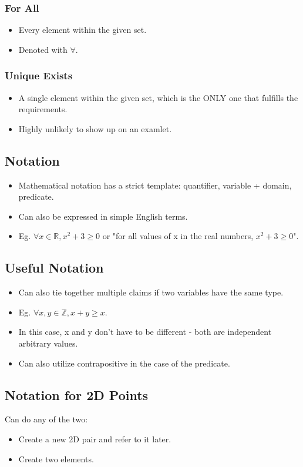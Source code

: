 \subsubsection{For All}
\begin{itemize}
    \item Every element within the given set.
    \item Denoted with $\forall$.
\end{itemize}
\subsubsection{Unique Exists}
\begin{itemize}
    \item A single element within the given set, which is the ONLY one that fulfills the requirements.
    \item Highly unlikely to show up on an examlet.
\end{itemize}
\subsection{Notation}
\begin{itemize}
    \item Mathematical notation has a strict template: quantifier, variable + domain, predicate.
    \item Can also be expressed in simple English terms.
    \item Eg. $\forall x \in \mathbb{R}, x^2+3\geq 0$ or "for all values of x in the real numbers, $x^2+3\geq 0$".
\end{itemize}
\subsection{Useful Notation}
\begin{itemize}
    \item Can also tie together multiple claims if two variables have the same type.
    \item Eg. $\forall x, y \in \mathbb{Z}, x + y \geq x$.
    \item In this case, x and y don't have to be different - both are independent arbitrary values.
    \item Can also utilize contrapositive in the case of the predicate.
\end{itemize}
\subsection{Notation for 2D Points}
Can do any of the two:
\begin{itemize}
    \item Create a new 2D pair and refer to it later.
    \item Create two elements.
\end{itemize}
